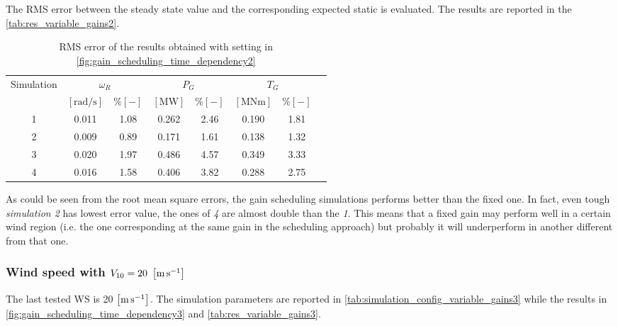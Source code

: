 The \acrshort{RMS} error between the steady state value and the corresponding expected static is evaluated. The results are reported in the \autoref{tab:res_variable_gains2}.
\begin{table}[htb]
  \caption{RMS error of the results obtained with setting in \autoref{fig:gain_scheduling_time_dependency2}}
  \centering
  \begin{tabular}{cccccccc}
    \toprule
      Simulation & \multicolumn{2}{c}{$\omega_R$} & \multicolumn{2}{c}{$P_G$} & \multicolumn{2}{c}{$T_G$} \\ 
       & $\left[\si{\radian\per\second}\right]$ & $ \% \left[-\right]$ & $\left[\si{\mega\watt}\right]$ & $ \% \left[-\right]$ & $\left[\si{\mega\newton\meter} \right]$ & $ \% \left[-\right]$ \\ \midrule      
     1 & 0.011 & 1.08 & 0.262 & 2.46 & 0.190 & 1.81 \\
     2 & 0.009 & 0.89 & 0.171 & 1.61 & 0.138 & 1.32 \\
     3 & 0.020 & 1.97 & 0.486 & 4.57 & 0.349 & 3.33 \\
     4 & 0.016 & 1.58 & 0.406 & 3.82 & 0.288 & 2.75 \\
     \bottomrule
  \end{tabular}
  \label{tab:res_variable_gains2}
\end{table}

As could be seen from the root mean square errors, the gain scheduling simulations performs better than the fixed one. In fact, even tough \textit{simulation 2} has lowest error value, the ones of \textit{4} are almost double than the \textit{1}. This means that a fixed gain may perform well in a certain wind region (i.e. the one corresponding at the same gain in the scheduling approach) but probably it will underperform in another different from that one.  

\subsubsection{Wind speed with $V_{10} =  20 \ \mesunt{\meter\per\second}$}
The last tested \acrshort{WS} is 20 $\left[\si{\meter\per\second}\right]$. The simulation parameters are reported in \autoref{tab:simulation_config_variable_gains3} while the results in \autoref{fig:gain_scheduling_time_dependency3} and \autoref{tab:res_variable_gains3}.

